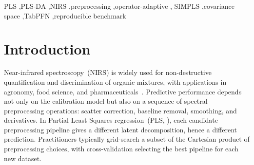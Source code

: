 \documentclass[review,a4paper]{elsarticle}
\newcommand{\AOM}{\textsc{AOM}\xspace}
\newcommand{\PLS}{\textsc{PLS}\xspace}
\newcommand{\nirsfourall}{\texttt{nirs4all}\xspace}
\begin{document}
\begin{frontmatter}
\begin{abstract}
benchmarks 128 variants under one estimator: the deployed production
\AOM-\PLS wins on 29/57 datasets (median RMSEP ratio $0.999$ vs
\PLS); the strongest variant overall is
\texttt{ASLS-AOM-compact-cv5}, an asymmetric-least-squares baseline
correction piped in front of the 9-operator compact bank with 5-fold
cross-validation replacing the deterministic 20\% holdout, which
reaches median ratio $\mathbf{0.960}$ with $\mathbf{42/57}$ wins, a
4\% median improvement and 13 additional dataset wins over the
deployed reference. \textbf{This new champion ties or beats three of
the four reference baselines from the TabPFN/NIRS paper at the
median}: TabPFN-Raw (0.994 median ratio, 30/57 wins), Catboost
(0.998, 28/56), and CNN (0.987, 28/51); only TabPFN-opt with its
per-dataset hyperparameter optimisation remains ahead (1.117, 18/57).
Runners-up \texttt{ASLS-AOM-response-dedup-cv3} (median $0.964$, 37
wins) and \texttt{ASLS-AOM-family-pruned-cv3} (median $0.964$, 38
wins) demonstrate that a response-cosine pruned 46-op bank or a
family-pruned 15-op bank, both with ASLS preprocessing and CV-3
selection, recover most of the headline gain. We do not claim
novelty for the \AOM-\PLS algorithm itself, which is the deployed
\nirsfourall implementation; we claim a parity-validated framework
wrapper that lets multi-view operator selection, beam-searched
composition chains, alternative selection criteria, non-linear
preprocessing baselines, and asymmetric-least-squares baseline
correction be evaluated against that production reference under one
mathematical contract.
\end{abstract}

\begin{keyword}
PLS \sep PLS-DA \sep NIRS \sep preprocessing \sep operator-adaptive \sep
SIMPLS \sep covariance space \sep TabPFN \sep reproducible benchmark
\end{keyword}

\end{frontmatter}

\section{Introduction}\label{sec:intro}

Near-infrared spectroscopy~(NIRS) is widely used for non-destructive
quantification and discrimination of organic mixtures, with applications
in agronomy, food science, and pharmaceuticals~\cite{williams2007implementation,
rinnan2009review}. Predictive performance depends not only on the
calibration model but also on a sequence of spectral preprocessing
operations: scatter correction, baseline removal, smoothing, and
derivatives. In Partial Least Squares regression~(\PLS,
\cite{wold1975soft, geladi1986partial, wold2001pls}), each candidate
preprocessing pipeline gives a different latent decomposition, hence a
different prediction. Practitioners typically grid-search a subset of
the Cartesian product of preprocessing choices, with cross-validation
selecting the best pipeline for each new dataset.
\end{document}
